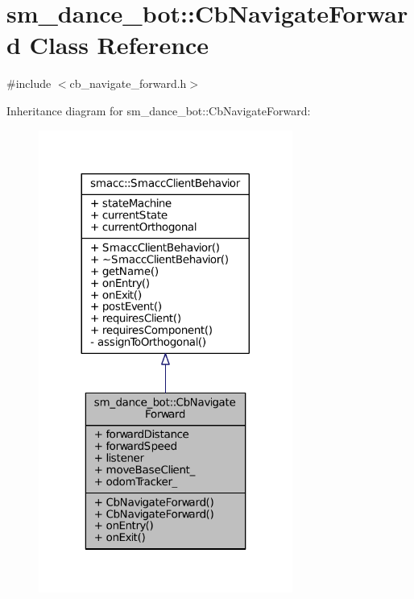 \hypertarget{classsm__dance__bot_1_1CbNavigateForward}{}\section{sm\+\_\+dance\+\_\+bot\+:\+:Cb\+Navigate\+Forward Class Reference}
\label{classsm__dance__bot_1_1CbNavigateForward}


{\ttfamily \#include $<$cb\+\_\+navigate\+\_\+forward.\+h$>$}



Inheritance diagram for sm\+\_\+dance\+\_\+bot\+:\+:Cb\+Navigate\+Forward\+:
\nopagebreak
\begin{figure}[H]
\begin{center}
\leavevmode
\includegraphics[width=236pt]{classsm__dance__bot_1_1CbNavigateForward__inherit__graph}
\end{center}
\end{figure}


